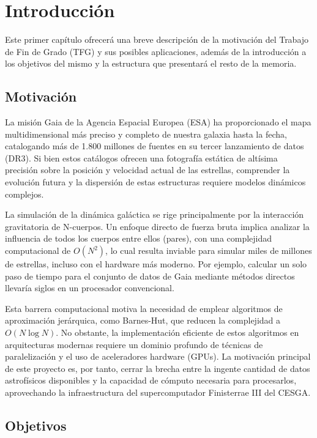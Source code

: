 \chapter{Introducción}
\label{chap:introducion}
Este primer capítulo ofrecerá una breve descripción de la motivación del Trabajo de Fin de Grado (TFG) y sus posibles aplicaciones, además de la introducción a los objetivos del mismo y la estructura que presentará el resto de la memoria.

\section{Motivación}\label{sec:motivacion}

La misión Gaia de la Agencia Espacial Europea (ESA) ha proporcionado el mapa multidimensional más preciso y completo de nuestra galaxia hasta la fecha, catalogando más de 1.800 millones de fuentes en su tercer lanzamiento de datos (DR3).
Si bien estos catálogos ofrecen una fotografía estática de altísima precisión sobre la posición y velocidad actual de las estrellas, comprender la evolución futura y la dispersión de estas estructuras requiere modelos dinámicos complejos.

La simulación de la dinámica galáctica se rige principalmente por la interacción gravitatoria de N-cuerpos.
Un enfoque directo de fuerza bruta implica analizar la influencia de todos los cuerpos entre ellos (pares), con una complejidad computacional de $O(N^2)$, lo cual resulta inviable para simular miles de millones de estrellas, incluso con el hardware más moderno.
Por ejemplo, calcular un solo paso de tiempo para el conjunto de datos de Gaia mediante métodos directos llevaría siglos en un procesador convencional.

Esta barrera computacional motiva la necesidad de emplear algoritmos de aproximación jerárquica, como Barnes-Hut, que reducen la complejidad a $O(N \log N)$.
No obstante, la implementación eficiente de estos algoritmos en arquitecturas modernas requiere un dominio profundo de técnicas de paralelización y el uso de aceleradores hardware (GPUs).
La motivación principal de este proyecto es, por tanto, cerrar la brecha entre la ingente cantidad de datos astrofísicos disponibles y la capacidad de cómputo necesaria para procesarlos, aprovechando la infraestructura del supercomputador Finisterrae III del CESGA.

\section{Objetivos}\label{sec:objetivos}

